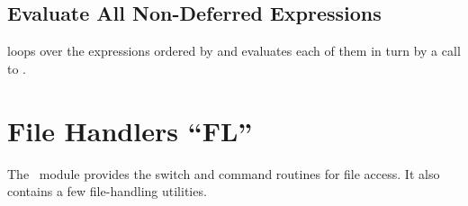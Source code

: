 \section{Evaluate All Non-Deferred Expressions}
\label{EXUPDT}
loops over the expressions ordered by  and evaluates
each of them in turn by a call to .


\chapter{File Handlers ``FL''}
\label{FL}
The ~module provides the switch and command routines for
file access.
It also contains a few file-handling utilities.

